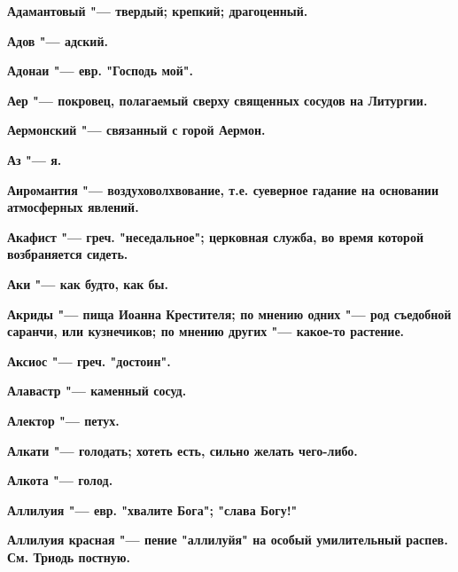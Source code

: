 \bfseries Адамантовый \normalfont{} "--- твердый; крепкий; драгоценный. 




\bfseries Адов \normalfont{} "--- адский. 




\bfseries Адонаи \normalfont{} "--- евр. "Господь мой". 




\bfseries Аер \normalfont{} "--- покровец, полагаемый сверху священных сосудов на Литургии. 




\bfseries Аермонский \normalfont{} "--- связанный с горой Аермон. 




\bfseries Аз \normalfont{} "--- я. 




\bfseries Аиромантия \normalfont{} "--- воздуховолхвование, т.е. суеверное гадание на основании атмосферных явлений. 




\bfseries Акафист \normalfont{} "--- греч. "неседальное"; церковная служба, во время которой возбраняется сидеть. 




\bfseries Аки \normalfont{} "--- как будто, как бы. 




\bfseries Акриды \normalfont{} "--- пища Иоанна Крестителя; по мнению одних "--- род съедобной саранчи, или кузнечиков; по мнению других "--- какое-то растение. 




\bfseries Аксиос \normalfont{} "--- греч. "достоин". 




\bfseries Алавастр \normalfont{} "--- каменный сосуд. 




\bfseries Алектор \normalfont{} "--- петух. 




\bfseries Алкати \normalfont{} "--- голодать; хотеть есть, сильно желать чего-либо. 




\bfseries Алкота \normalfont{} "--- голод. 




\bfseries Аллилуия \normalfont{} "--- евр. "хвалите Бога"; "слава Богу!" 




\bfseries Аллилуия красная \normalfont{} "--- пение "аллилуйя" на особый умилительный распев. См. Триодь постную. 




